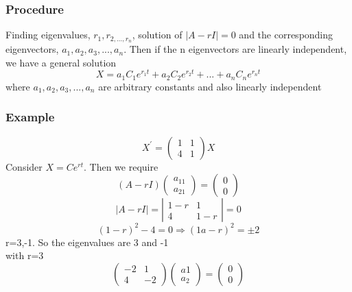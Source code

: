 \documentclass[a4paper,12pt]{report}
\numberwithin{equation}{section}
\begin{document}
\subsubsection*{Procedure}
Finding eigenvalues, $r_{1},r_{2,...,r_{n}}$, solution of $|A-rI|=0$ and the corresponding eigenvectors, $a_{1},a_{2},a_{3},...,a_{n}$. Then if the n eigenvectors are linearly independent, we have a general solution
\begin{equation}
X=a_{1}C_{1}e^{r_{1}t}+a_{2}C_{2}e^{r_{2}t}+ ... + a_{n}C_{n}e^{r_{n}t}
\end{equation}
where $a_{1},a_{2},a_{3},...,a_{n}$ are arbitrary constants and also linearly independent
\subsubsection*{Example}
\begin{equation*}
X^{\prime}=\left(\begin{matrix}
1 & 1 \\
4 & 1 
\end{matrix} \right)X
\end{equation*}
Consider $ X = Ce^{rt}$. Then we require 
\begin{equation*}
(A-rI)\begin{pmatrix}
a_{11} \\
a_{21}
\end{pmatrix}=\begin{pmatrix}
0 \\
0
\end{pmatrix}
\end{equation*}
\begin{equation*}
|A-rI|=\left| \begin{matrix}
1-r & 1 \\
4 & 1-r
\end{matrix} \right|=0
\end{equation*}
\begin{equation*}
(1-r)^{2}-4=0 \Rightarrow (1a-r)^{2}=\pm 2
\end{equation*}
r=3,-1. So the eigenvalues are 3 and -1 \\
with r=3
\begin{equation*}
\left(\begin{matrix}
-2 & 1 \\
4 & -2
\end{matrix}\right) \begin{pmatrix}
a{1} \\
a_{2}
\end{pmatrix}=\begin{pmatrix}
0 \\
0
\end{pmatrix}
\end{equation*}
\end{document}
